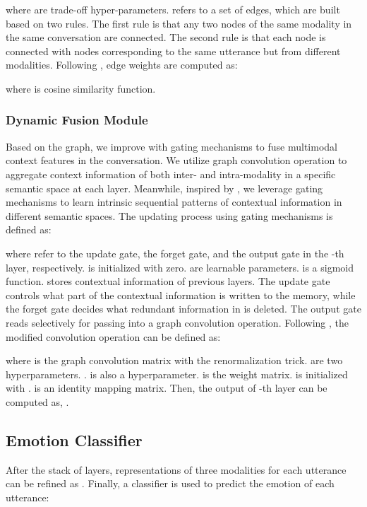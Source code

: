 \documentclass{article}
\begin{document}
where  are trade-off hyper-parameters.
 refers to a set of edges, which are built based on two rules. 
The first rule is that any two nodes of the same modality in the same conversation are connected.
The second rule is that each node is connected with nodes corresponding to the same utterance but from different modalities.
Following \cite{DBLP:conf/textgraphs/SkianisMV18}, edge weights are computed as:

where  is cosine similarity function.


\subsubsection{Dynamic Fusion Module}
Based on the graph, we improve 
\cite{DBLP:conf/iclr/KipfW17}
with gating mechanisms to fuse multimodal context features in the conversation. 
We utilize graph convolution operation to aggregate context information of both inter- and intra-modality in a specific semantic space at each layer.
Meanwhile, inspired by \cite{DBLP:journals/neco/HochreiterS97}, we leverage gating mechanisms to learn  intrinsic  sequential patterns of contextual  information in different semantic spaces.
The updating process using gating mechanisms is defined  as:

where  refer to the update gate, the forget gate, and the output gate in the -th layer, respectively. 
 is initialized with zero. 
 are learnable parameters. 
 is a sigmoid function.
 stores contextual information of previous layers.
The update gate  controls what part of the contextual information is written to the memory, while the forget gate   decides what redundant information in  is deleted.
The output gate  reads selectively for passing into a graph convolution operation. 
Following \cite{DBLP:conf/icml/ChenWHDL20}, the modified convolution operation can be defined as: 

where  is the graph convolution matrix with the renormalization trick. 
 are two hyperparameters. .  is also a hyperparameter.   is the weight matrix.
 is initialized with .
 is an identity mapping matrix.
Then, the output of -th layer can be computed as,
.





\subsection{Emotion Classifier} \label{sec:emo}
After the stack of  layers, representations of three modalities for each utterance  can be refined as . 
Finally, a classifier is used to predict the emotion of each utterance:
 
\end{document}
